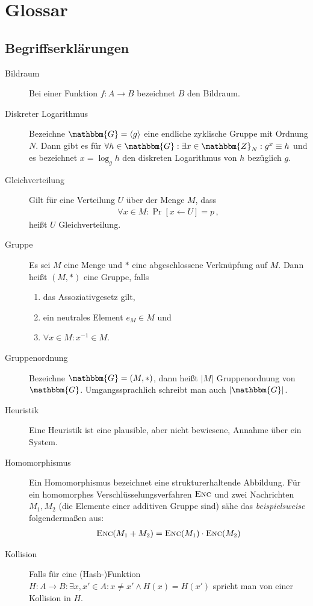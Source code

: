 \chapter{Glossar}
\section{Begriffserklärungen}
\begin{description}
	\item[Bildraum] Bei einer Funktion $f\colon A \rightarrow B$ bezeichnet $B$ den Bildraum.
	\item[Diskreter Logarithmus] Bezeichne $\mathbbm{G} = \langle g \rangle$ eine endliche zyklische Gruppe mit Ordnung $N$. Dann gibt es für
	$\forall h \in \mathbbm{G} : \exists x \in \mathbbm{Z}_N :  g^x \equiv h$ und es bezeichnet $x = \log_g h$ den diskreten Logarithmus von $h$
	bezüglich $g$.
	\item[Gleichverteilung] Gilt für eine Verteilung $U$ über der Menge $M$, dass
	\begin{align*}
		\forall x \in M : \Pr [x \leftarrow U] = p\, ,
	\end{align*}
	heißt $U$ Gleichverteilung.
	\item[Gruppe] Es sei $M$ eine Menge und $\ast$ eine abgeschlossene Verknüpfung auf $M$. Dann heißt $(M, \ast)$ eine Gruppe, falls
	\begin{enumerate}
		\item das Assoziativgesetz gilt,
		\item ein neutrales Element $e_M \in M$ und
		\item $\forall x \in M : x^{-1} \in M$.
	\end{enumerate}
	\item[Gruppenordnung] Bezeichne $\mathbbm{G} = (M, \ast)$, dann heißt $\vert M \vert$ Gruppenordnung von $\mathbbm{G}$. Umgangssprachlich
	schreibt man auch $\vert \mathbbm{G} \vert$.
	\item[Heuristik] Eine Heuristik ist eine plausible, aber nicht bewiesene, Annahme über ein System.
	\item[Homomorphismus] Ein Homomorphismus bezeichnet eine strukturerhaltende Abbildung. Für ein homomorphes Verschlüsselungsverfahren $\textsc{Enc}$
	und zwei Nachrichten $M_1, M_2$ (die Elemente einer additiven Gruppe sind) sähe das \emph{beispielsweise} folgendermaßen aus:
	\begin{align*}
		\textsc{Enc}(M_1 + M_2) = \textsc{Enc}(M_1) \cdot \textsc{Enc}(M_2)
	\end{align*}
	\item[Kollision] Falls für eine (Hash-)Funktion $H\colon A \rightarrow B : \exists x, x' \in A : x \neq x' \land H(x) = H(x')$ spricht man von einer Kollision in $H$.

\end{description}
